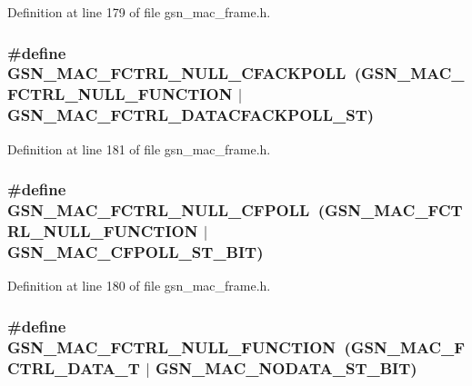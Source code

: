 Definition at line 179 of file gsn\_\-mac\_\-frame.h.

\hypertarget{a00523_a8e075af8e050ddcaa625f25bab525c05}{
\subsubsection[{GSN\_\-MAC\_\-FCTRL\_\-NULL\_\-CFACKPOLL}]{\setlength{\rightskip}{0pt plus 5cm}\#define GSN\_\-MAC\_\-FCTRL\_\-NULL\_\-CFACKPOLL~(GSN\_\-MAC\_\-FCTRL\_\-NULL\_\-FUNCTION  $|$ GSN\_\-MAC\_\-FCTRL\_\-DATACFACKPOLL\_\-ST)}}
\label{a00523_a8e075af8e050ddcaa625f25bab525c05}


Definition at line 181 of file gsn\_\-mac\_\-frame.h.

\hypertarget{a00523_ac716080f065a7f79ff3a228f85e62a50}{
\subsubsection[{GSN\_\-MAC\_\-FCTRL\_\-NULL\_\-CFPOLL}]{\setlength{\rightskip}{0pt plus 5cm}\#define GSN\_\-MAC\_\-FCTRL\_\-NULL\_\-CFPOLL~(GSN\_\-MAC\_\-FCTRL\_\-NULL\_\-FUNCTION  $|$ GSN\_\-MAC\_\-CFPOLL\_\-ST\_\-BIT)}}
\label{a00523_ac716080f065a7f79ff3a228f85e62a50}


Definition at line 180 of file gsn\_\-mac\_\-frame.h.

\hypertarget{a00523_a15c64655335850ccc8e12213e0062bfd}{
\subsubsection[{GSN\_\-MAC\_\-FCTRL\_\-NULL\_\-FUNCTION}]{\setlength{\rightskip}{0pt plus 5cm}\#define GSN\_\-MAC\_\-FCTRL\_\-NULL\_\-FUNCTION~(GSN\_\-MAC\_\-FCTRL\_\-DATA\_\-T    $|$ GSN\_\-MAC\_\-NODATA\_\-ST\_\-BIT)}}
\label{a00523_a15c64655335850ccc8e12213e0062bfd}


